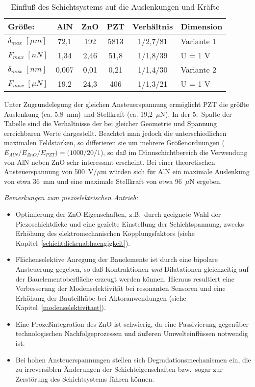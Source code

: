 \begin{table}[htb]
\caption{\label{tabvglalnznopzt}
 Einfluß des Schichtsystems auf die Auslenkungen und Kräfte}
\begin{center}
\begin{tabular}{|l||c|c|c|c||l|} \hline
Größe: & AlN & ZnO & PZT & Verhältnis & Dimension \\
\hline \hline
$ \delta_{max} \; [\mu m] $  & 72,1 & 192 & 5813 & 1/2,7/81 & Variante 1 \\
\cline{1-5}
$ F_{max} \; [nN] $  & 1,34 & 2,46 & 51,8 & 1/1,8/39 & U = 1 V
\\ \hline \hline
$ \delta_{max} \; [nm] $  & 0,007 & 0,01 & 0,21 & 1/1,4/30 & Variante 2 \\
\cline{1-5}
$ F_{max} \; [\mu N] $  & 19,2 & 24,3 & 406 & 1/1,3/21 & U = 1 V \\
\hline
\end{tabular}
\end{center}
\end{table}
Unter Zugrundelegung der gleichen Ansteuerspannung ermöglicht PZT die
größte Auslenkung (ca. 5,8~mm) und Stellkraft (ca. 19,2~$\mu$N). In der
5.~Spalte der Tabelle sind die Verhältnisse der bei gleicher Geometrie
und Spannung erreichbaren Werte dargestellt. Beachtet man jedoch die
unterschiedlichen maximalen Feldstärken, so differieren sie um mehrere
Größenordnungen ($E_{AlN} / E_{ZnO} / E_{PZT}) = (1000 / 20 / 1$),
so daß im Dünnschichtbereich die Verwendung von AlN neben ZnO sehr
interessant erscheint. Bei einer theoretischen Ansteuerspannung von
500~V/$\mu$m würden sich für AlN ein maximale Auslenkung von etwa 36~mm
und eine maximale Stellkraft von etwa 96~$\mu$N ergeben.


{\em Bemerkungen zum piezoelektrischen Antrieb:}
\begin{itemize}
\item Optimierung der ZnO-Eigenschaften, z.B.\ durch geeignete Wahl der
Piezoschichtdicke und eine gezielte Einstellung der Schichtspannung,
zwecks Erhöhung des elektromechanischen Kopplungsfaktors
(siehe Kapitel~\ref{schichtdickenabhaengigkeit}).
\item Flächenselektive Anregung der Bauelemente ist durch eine bipolare
Ansteuerung gegeben, so daß Kontraktionen {\em und} Dilatationen
gleichzeitig auf der Bauelement\-oberfläche erzeugt werden können.
Hieraus resultiert eine Verbesserung der Modenselektivität bei resonanten
Sensoren und eine Erhöhung der Bauteilhübe bei Aktoranwendungen
(siehe Kapitel~\ref{modenselektivitaet}).
\item Eine Prozeßintegration des ZnO ist schwierig, da eine Passivierung
gegenüber technologischen Nachfolgeprozessen und äußeren Umwelteinflüssen
notwendig ist.
\item Bei hohen Ansteuerspannungen stellen sich Degradationsmechanismen ein,
die zu irreversiblen Änderungen der Schichteigenschaften bzw.\ sogar zur
Zerstörung des Schichtsystems führen können.
\end{itemize}

